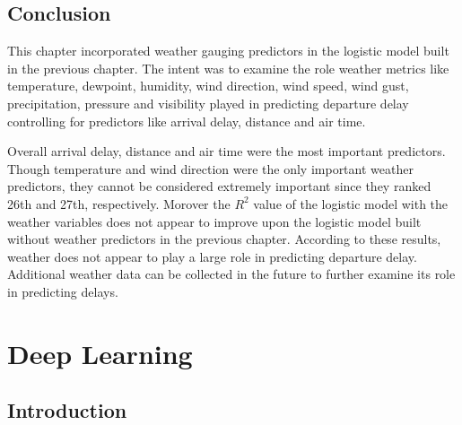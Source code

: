 \documentclass[12pt,twoside]{amherstthesis}
\begin{document}
  \begin{Shaded}
  \begin{Highlighting}[]
  \StringTok{ }\NormalTok{(}  
  \end{Highlighting}
  \end{Shaded}
  
  \section{Conclusion}\label{conclusion-1}
  
  This chapter incorporated weather gauging predictors in the logistic
  model built in the previous chapter. The intent was to examine the role
  weather metrics like temperature, dewpoint, humidity, wind direction,
  wind speed, wind gust, precipitation, pressure and visibility played in
  predicting departure delay controlling for predictors like arrival
  delay, distance and air time.
  
  Overall arrival delay, distance and air time were the most important
  predictors. Though temperature and wind direction were the only
  important weather predictors, they cannot be considered extremely
  important since they ranked 26th and 27th, respectively. Morover the
  \(R^{2}\) value of the logistic model with the weather variables does
  not appear to improve upon the logistic model built without weather
  predictors in the previous chapter. According to these results, weather
  does not appear to play a large role in predicting departure delay.
  Additional weather data can be collected in the future to further
  examine its role in predicting delays.
  
  \chapter{Deep Learning}\label{deep-learning}
  
  \section{Introduction}\label{introduction-4}
  
\end{document}

